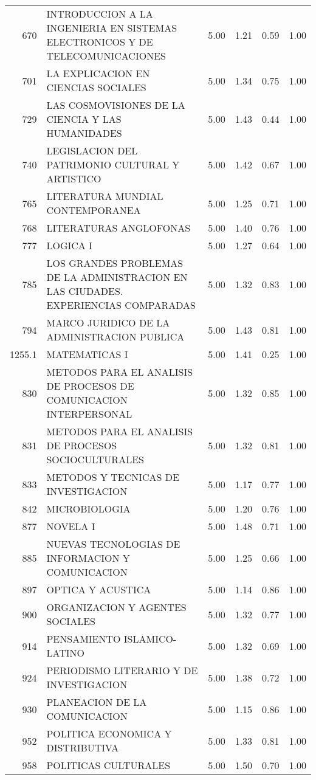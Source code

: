 \documentclass[12pt]{article}
\begin{document}
\begin{table}[ht]
\begin{tabular}{rlrrrr}
  670 & INTRODUCCION A LA INGENIERIA EN SISTEMAS ELECTRONICOS Y DE TELECOMUNICACIONES & 5.00 & 1.21 & 0.59 & 1.00 \\ 
  701 & LA EXPLICACION EN CIENCIAS SOCIALES & 5.00 & 1.34 & 0.75 & 1.00 \\ 
  729 & LAS COSMOVISIONES DE LA CIENCIA Y LAS HUMANIDADES & 5.00 & 1.43 & 0.44 & 1.00 \\ 
  740 & LEGISLACION DEL PATRIMONIO CULTURAL Y ARTISTICO & 5.00 & 1.42 & 0.67 & 1.00 \\ 
  765 & LITERATURA MUNDIAL CONTEMPORANEA & 5.00 & 1.25 & 0.71 & 1.00 \\ 
  768 & LITERATURAS ANGLOFONAS & 5.00 & 1.40 & 0.76 & 1.00 \\ 
  777 & LOGICA I & 5.00 & 1.27 & 0.64 & 1.00 \\ 
  785 & LOS GRANDES PROBLEMAS DE LA ADMINISTRACION EN LAS CIUDADES. EXPERIENCIAS COMPARADAS & 5.00 & 1.32 & 0.83 & 1.00 \\ 
  794 & MARCO JURIDICO DE LA ADMINISTRACION PUBLICA & 5.00 & 1.43 & 0.81 & 1.00 \\ 
  1255.1 & MATEMATICAS I & 5.00 & 1.41 & 0.25 & 1.00 \\ 
  830 & METODOS PARA EL ANALISIS DE PROCESOS DE COMUNICACION INTERPERSONAL & 5.00 & 1.32 & 0.85 & 1.00 \\ 
  831 & METODOS PARA EL ANALISIS DE PROCESOS SOCIOCULTURALES & 5.00 & 1.32 & 0.81 & 1.00 \\ 
  833 & METODOS Y TECNICAS DE INVESTIGACION & 5.00 & 1.17 & 0.77 & 1.00 \\ 
  842 & MICROBIOLOGIA & 5.00 & 1.20 & 0.76 & 1.00 \\ 
  877 & NOVELA I & 5.00 & 1.48 & 0.71 & 1.00 \\ 
  885 & NUEVAS TECNOLOGIAS DE INFORMACION Y COMUNICACION & 5.00 & 1.25 & 0.66 & 1.00 \\ 
  897 & OPTICA Y ACUSTICA & 5.00 & 1.14 & 0.86 & 1.00 \\ 
  900 & ORGANIZACION Y AGENTES SOCIALES & 5.00 & 1.32 & 0.77 & 1.00 \\ 
  914 & PENSAMIENTO ISLAMICO-LATINO & 5.00 & 1.32 & 0.69 & 1.00 \\ 
  924 & PERIODISMO LITERARIO Y DE INVESTIGACION & 5.00 & 1.38 & 0.72 & 1.00 \\ 
  930 & PLANEACION DE LA COMUNICACION & 5.00 & 1.15 & 0.86 & 1.00 \\ 
  952 & POLITICA ECONOMICA Y DISTRIBUTIVA & 5.00 & 1.33 & 0.81 & 1.00 \\ 
  958 & POLITICAS CULTURALES & 5.00 & 1.50 & 0.70 & 1.00 \\ 

\end{tabular}
\end{table}
\end{document}
